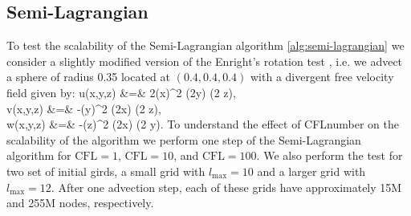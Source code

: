 \subsection{Semi-Lagrangian}
To test the scalability of the Semi-Lagrangian algorithm \ref{alg:semi-lagrangian} we consider a slightly modified version of the Enright's rotation test \cite{Enright;Fedkiw;Ferziger;etal:02:A-Hybrid-Particle-Le}, i.e. we advect a sphere of radius 0.35 located at $(0.4, 0.4, 0.4)$ with a divergent free velocity field given by:
\bean
u(x,y,z) &=& 2\sin(\pi x)^2 \sin(2\pi y) \sin(2 \pi z), \\
v(x,y,z) &=& -\sin(\pi y)^2 \sin(2\pi x) \sin(2 \pi z),\\
w(x,y,z) &=& -\sin(\pi z)^2 \sin(2\pi x) \sin(2 \pi y). 
\eean
To understand the effect of CFLnumber on the scalability of the algorithm we perform one step of the Semi-Lagrangian algorithm for $\text{CFL} = 1$, $\text{CFL} = 10$, and $\text{CFL} = 100$. We also perform the test for two set of initial girds, a small grid with $l_\text{max} = 10$ and a larger grid with $l_\text{max} = 12$. After one advection step, each of these grids have approximately 15M and 255M nodes, respectively. 
